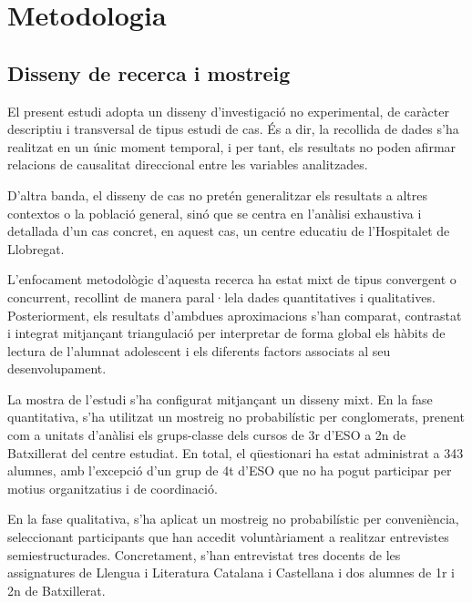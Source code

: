 \documentclass[12pt]{article}
\begin{document}
\newpage
\section{Metodologia}

\subsection{Disseny de recerca i mostreig}
El present estudi adopta un disseny d'investigació no experimental, de caràcter descriptiu i transversal de tipus estudi de cas. És a dir, la recollida de dades s'ha realitzat en un únic moment temporal, i per tant, els resultats no poden afirmar relacions de causalitat direccional entre les variables analitzades.

D'altra banda, el disseny de cas no pretén generalitzar els resultats a altres contextos o la població general, sinó que se centra en l'anàlisi exhaustiva i detallada d'un cas concret, en aquest cas, un centre educatiu de l'Hospitalet de Llobregat.

L’enfocament metodològic d'aquesta recerca ha estat mixt de tipus convergent o concurrent, recollint de manera paral·lela dades quantitatives i qualitatives. Posteriorment, els resultats d'ambdues aproximacions s'han comparat, contrastat i integrat mitjançant triangulació per interpretar de forma global els hàbits de lectura de l'alumnat adolescent i els diferents factors associats al seu desenvolupament.

La mostra de l’estudi s’ha configurat mitjançant un disseny mixt. En la fase quantitativa, s’ha utilitzat un mostreig no probabilístic per conglomerats, prenent com a unitats d’anàlisi els grups-classe dels cursos de 3r d’ESO a 2n de Batxillerat del centre estudiat. En total, el qüestionari ha estat administrat a 343 alumnes, amb l’excepció d’un grup de 4t d’ESO que no ha pogut participar per motius organitzatius i de coordinació.

En la fase qualitativa, s’ha aplicat un mostreig no probabilístic per conveniència, seleccionant participants que han accedit voluntàriament a realitzar entrevistes semiestructurades. Concretament, s’han entrevistat tres docents de les assignatures de Llengua i Literatura Catalana i Castellana i dos alumnes de 1r i 2n de Batxillerat.
\end{document}
